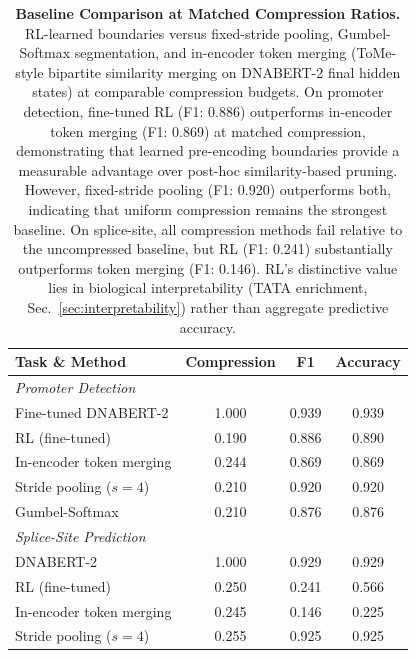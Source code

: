 \documentclass[sigconf,screen]{acmart}
\begin{document}
\begin{table}[!ht]
\centering
\small
\begin{tabular}{lccc}
\toprule
\textbf{Task \& Method} & \textbf{Compression} & \textbf{F1} & \textbf{Accuracy} \\
\midrule
\multicolumn{4}{l}{\textit{Promoter Detection}} \\
Fine-tuned DNABERT-2 & 1.000 & 0.939 & 0.939 \\
RL (fine-tuned) & 0.190 & 0.886 & 0.890 \\
In-encoder token merging & 0.244 & 0.869 & 0.869 \\
Stride pooling ($s=4$) & 0.210 & 0.920 & 0.920 \\
Gumbel-Softmax & 0.210 & 0.876 & 0.876 \\
\midrule
\multicolumn{4}{l}{\textit{Splice-Site Prediction}} \\
DNABERT-2 & 1.000 & 0.929 & 0.929 \\
RL (fine-tuned) & 0.250 & 0.241 & 0.566 \\
In-encoder token merging & 0.245 & 0.146 & 0.225 \\
Stride pooling ($s=4$) & 0.255 & 0.925 & 0.925 \\
\bottomrule
\end{tabular}
\caption{\textbf{Baseline Comparison at Matched Compression Ratios.} RL-learned boundaries versus fixed-stride pooling, Gumbel-Softmax segmentation, and in-encoder token merging (ToMe-style bipartite similarity merging on DNABERT-2 final hidden states) at comparable compression budgets. On promoter detection, fine-tuned RL (F1: 0.886) outperforms in-encoder token merging (F1: 0.869) at matched compression, demonstrating that learned pre-encoding boundaries provide a measurable advantage over post-hoc similarity-based pruning. However, fixed-stride pooling (F1: 0.920) outperforms both, indicating that uniform compression remains the strongest baseline. On splice-site, all compression methods fail relative to the uncompressed baseline, but RL (F1: 0.241) substantially outperforms token merging (F1: 0.146). RL's distinctive value lies in biological interpretability (TATA enrichment, Sec.~\ref{sec:interpretability}) rather than aggregate predictive accuracy.}
\label{tab:baseline_compression}
\end{table}
\end{document}
